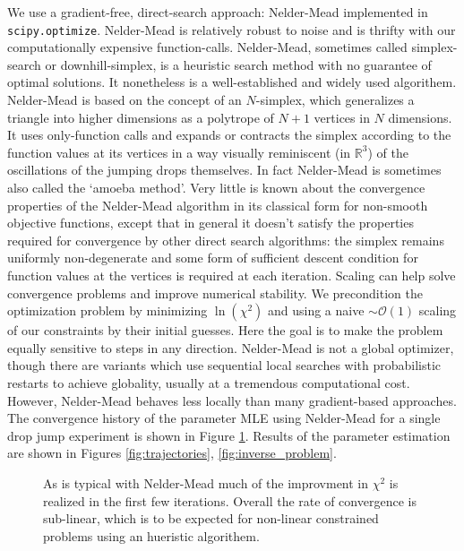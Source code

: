 \documentclass[12pt,a4paper,oneside]{book}
\begin{document}
We use a gradient-free, direct-search approach: Nelder-Mead\cite{nelder_simplex_1965} implemented in \verb|scipy.optimize|. Nelder-Mead is relatively robust to noise and is thrifty with our computationally expensive function-calls. Nelder-Mead, sometimes called simplex-search or downhill-simplex, is a heuristic search method with no guarantee of optimal solutions. It nonetheless is a well-established and widely used algorithem. Nelder-Mead is based on the concept of an $N$-simplex, which generalizes a triangle into higher dimensions as a polytrope of $N + 1$ vertices in $N$ dimensions. It uses only-function calls and expands or contracts the simplex according to the function values at its vertices in a way visually reminiscent (in $\mathbb{R}^3$) of the oscillations of the jumping drops themselves. In fact Nelder-Mead is sometimes also called the `amoeba method'. Very little is known about the convergence properties of the Nelder-Mead algorithm in its classical form for non-smooth objective functions\cite{price_convergent_2002}, except that in general it doesn't satisfy the properties required for convergence by other direct search algorithms: the simplex remains uniformly non-degenerate and some form of sufficient descent condition for function values at the vertices is required at each iteration. Scaling can help solve convergence problems and improve numerical stability. We precondition the optimization problem by minimizing $\ln(\chi^2)$ and using a naive $\sim \mathcal{O}(1)$ scaling of our constraints by their initial guesses. Here the goal is to make the problem equally sensitive to steps in any direction. Nelder-Mead is not a global optimizer, though there are variants which use sequential local searches with probabilistic restarts to achieve globality, usually at a tremendous computational cost. However, Nelder-Mead behaves less locally than many gradient-based approaches. The convergence history of the parameter MLE using Nelder-Mead for a single drop jump experiment is shown in Figure \ref{fig:convergence}. Results of the parameter estimation are shown in Figures \ref{fig:trajectories}, \ref{fig:inverse_problem}.

\begin{figure}[h]
    \centering
    
    \caption{As is typical with Nelder-Mead much of the improvment in $\chi^2$ is realized in the first few iterations. Overall the rate of convergence is sub-linear, which is to be expected for non-linear constrained problems using an hueristic algorithem.\label{fig:convergence}}
\end{figure}
\end{document}

